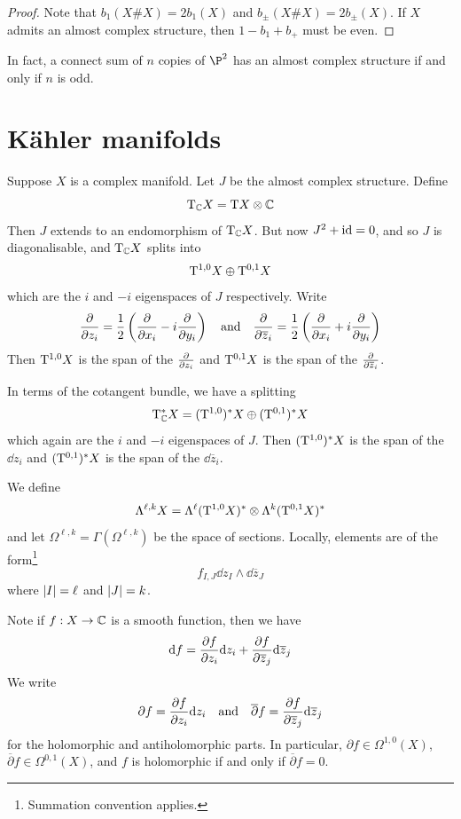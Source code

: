 \documentclass{article}
\begin{document}
\begin{proof}
    Note that \(b_1(X \# X) = 2b_1(X)\) and \(b_\pm(X \# X) = 2b_\pm (X)\). If \(X\) admits an almost complex structure, then \(1 - b_1 + b_+\) must be even.
\end{proof}

In fact, a connect sum of \(n\) copies of \(\P^2\) has an almost complex structure if and only if \(n\) is odd.

\section{K\"ahler manifolds}

Suppose \(X\) is a complex manifold. Let \(J\) be the almost complex structure. Define
\[\mathrm{T}_{\mathbb{C}} X = \mathrm{T} X \otimes \mathbb{C}\]
Then \(J\) extends to an endomorphism of \(\mathrm{T}_{\mathbb{C}} X\). But now \(J^2 + \operatorname{id} = 0\), and so \(J\) is diagonalisable, and \(\mathrm{T}_{\mathbb{C}} X\) splits into
\[\mathrm{T}^{1,0}X \oplus \mathrm{T}^{0, 1}X\]
which are the \(i\) and \(-i\) eigenspaces of \(J\) respectively. Write
\[\pdv{z_i} = \frac{1}{2}\left(\pdv{x_i} - i\pdv{y_i}\right) \qqtext{and} \pdv{\overline z_i} = \frac{1}{2}\left(\pdv{x_i} + i\pdv{y_i}\right)\]
Then \(\mathrm{T}^{1, 0}X\) is the span of the \(\pdv{z_i}\) and \(\mathrm{T}^{0, 1}X\) is the span of the \(\pdv{\overline z_i}\).

In terms of the cotangent bundle, we have a splitting
\[\mathrm{T}_{\mathbb{C}}^* X = (\mathrm{T}^{1, 0})^*X \oplus (\mathrm{T}^{0, 1})^*X\]
which again are the \(i\) and \(-i\) eigenspaces of \(J\). Then \((\mathrm{T}^{1, 0})^*X\) is the span of the \(\dd z_i\) and \((\mathrm{T}^{0, 1})^*X\) is the span of the \(\dd \overline z_i\).

We define
\[\Lambda^{\ell, k}X = \Lambda^\ell (\mathrm{T}^{1, 0}X)^* \otimes \Lambda^k (\mathrm{T}^{0,1}X)^*\]
and let \(\Omega^{\ell, k} = \Gamma(\Omega^{\ell, k})\) be the space of sections. Locally, elements are of the form\footnote{Summation convention applies.}
\[f_{I, J}\dd z_I \wedge \dd \overline{z}_J\]
where \(\abs{I} = \ell\) and \(\abs{J} = k\).

Note if \(f : X \to \mathbb{C}\) is a smooth function, then we have
\[\dd f = \pdv{f}{z_i}\dd z_i + \pdv{f}{\overline{z}_j}\dd \overline z_j\]
We write
\[\partial f = \pdv{f}{z_i}\dd z_i \qqtext{and}\overline\partial f = \pdv{f}{\overline z_j}\dd \overline z_j\]
for the holomorphic and antiholomorphic parts. In particular, \(\partial f \in \Omega^{1, 0}(X)\), \(\overline\partial f \in \Omega^{0, 1}(X)\), and \(f\) is holomorphic if and only if \(\overline\partial f = 0\).

\lec
\end{document}
